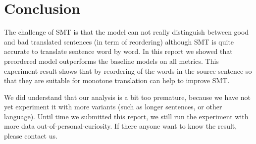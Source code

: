 \documentclass[11pt,DIV=11]{scrartcl}
\begin{document}
\section{Conclusion}
\label{conclusion}

The challenge of SMT is that the model can not really distinguish between good and bad translated sentences (in term of reordering) although SMT is quite accurate to translate sentence word by word.
In this report we showed that preordered model outperforms the baseline models on all metrics.
This experiment result shows that by reordering of the words in the source sentence so that they are suitable for monotone translation can help to improve SMT.

We did understand that our analysis is a bit too premature, because we have not yet experiment it with more variants (such as longer sentences, or other language).
Until time we submitted this report, we still run the experiment with more data out-of-personal-curiosity.
If there anyone want to know the result, please contact us.


{\small
	
}
\end{document}
